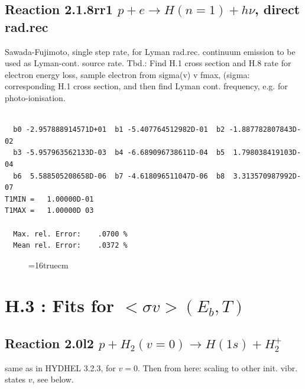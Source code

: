 \documentclass[12pt,dvipdfmx]{article}
\begin{document}
\subsection{
Reaction 2.1.8rr1
 $ p + e \rightarrow H(n=1) + h\nu$, direct rad.rec
}
Sawada-Fujimoto, single step rate, for Lyman rad.rec. continuum emission
to be used as Lyman-cont. source rate.
Tbd.: Find H.1 cross section and H.8 rate for electron energy loss,
sample electron from sigma(v) v fmax, (sigma:  corresponding H.1 cross section,
and then find Lyman cont. frequency, e.g. for photo-ionisation.


\begin{small}\begin{verbatim}

  b0 -2.957888914571D+01  b1 -5.407764512982D-01  b2 -1.887782807843D-02
  b3 -5.957963562133D-03  b4 -6.689096738611D-04  b5  1.798038419103D-04
  b6  5.588505208658D-06  b7 -4.618096511047D-06  b8  3.313570987992D-07
T1MIN =   1.00000D-01
T1MAX =   1.00000D 03

  Max. rel. Error:    .0700 %
  Mean rel. Error:    .0372 %

\end{verbatim}\end{small}
\begin{figure} \label{2.1.8rr1}
\epsfxsize=16truecm
\end{figure}
\newpage


\section{H.3 :  Fits for $<\sigma v> (E_b,T)$}

\subsection{
Reaction 2.0l2 $   p + H_2(v=0) \rightarrow H(1s) + H_2^+$}
same as in HYDHEL 3.2.3, for $v=0$.
Then from here: scaling to other init. vibr. states $v$, see below.
\end{document}
